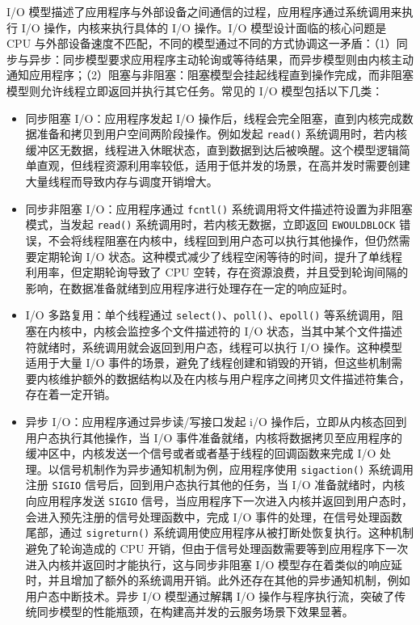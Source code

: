 I/O 模型描述了应用程序与外部设备之间通信的过程，应用程序通过系统调用来执行 I/O 操作，内核来执行具体的 I/O 操作。I/O 模型设计面临的核心问题是 CPU 与外部设备速度不匹配，不同的模型通过不同的方式协调这一矛盾：（1）同步与异步：同步模型要求应用程序主动轮询或等待结果，而异步模型则由内核主动通知应用程序；（2）阻塞与非阻塞：阻塞模型会挂起线程直到操作完成，而非阻塞模型则允许线程立即返回并执行其它任务。常见的 I/O 模型包括以下几类：

\begin{itemize}
    \item 同步阻塞 I/O：应用程序发起 I/O 操作后，线程会完全阻塞，直到内核完成数据准备和拷贝到用户空间两阶段操作。例如发起 \verb|read()| 系统调用时，若内核缓冲区无数据，线程进入休眠状态，直到数据到达后被唤醒。这个模型逻辑简单直观，但线程资源利用率较低，适用于低并发的场景，在高并发时需要创建大量线程而导致内存与调度开销增大。
    
    \item 同步非阻塞 I/O：应用程序通过 \verb|fcntl()| 系统调用将文件描述符设置为非阻塞模式，当发起 \verb|read()| 系统调用时，若内核无数据，立即返回 \verb|EWOULDBLOCK| 错误，不会将线程阻塞在内核中，线程回到用户态可以执行其他操作，但仍然需要定期轮询 I/O 状态。这种模式减少了线程空闲等待的时间，提升了单线程利用率，但定期轮询导致了 CPU 空转，存在资源浪费，并且受到轮询间隔的影响，在数据准备就绪到应用程序进行处理存在一定的响应延时。
    
    \item I/O 多路复用：单个线程通过 \verb|select()|、\verb|poll()|、\verb|epoll()| 等系统调用，阻塞在内核中，内核会监控多个文件描述符的 I/O 状态，当其中某个文件描述符就绪时，系统调用就会返回到用户态，线程可以执行 I/O 操作。这种模型适用于大量 I/O 事件的场景，避免了线程创建和销毁的开销，但这些机制需要内核维护额外的数据结构以及在内核与用户程序之间拷贝文件描述符集合，存在着一定开销。
    
    \item 异步 I/O：应用程序通过异步读/写接口发起 i/O 操作后，立即从内核态回到用户态执行其他操作，当 I/O 事件准备就绪，内核将数据拷贝至应用程序的缓冲区中，内核发送一个信号或者或者基于线程的回调函数来完成 I/O 处理。以信号机制作为异步通知机制为例，应用程序使用 \verb|sigaction()| 系统调用注册 \verb|SIGIO| 信号后，回到用户态执行其他的任务，当 I/O 准备就绪时，内核向应用程序发送 \verb|SIGIO| 信号，当应用程序下一次进入内核并返回到用户态时，会进入预先注册的信号处理函数中，完成 I/O 事件的处理，在信号处理函数尾部，通过 \verb|sigreturn()| 系统调用使应用程序从被打断处恢复执行。这种机制避免了轮询造成的 CPU 开销，但由于信号处理函数需要等到应用程序下一次进入内核并返回时才能执行，这与同步非阻塞 I/O 模型存在着类似的响应延时，并且增加了额外的系统调用开销。此外还存在其他的异步通知机制，例如用户态中断技术。异步 I/O 模型通过解耦 I/O 操作与程序执行流，突破了传统同步模型的性能瓶颈，在构建高并发的云服务场景下效果显著。
    
\end{itemize}


